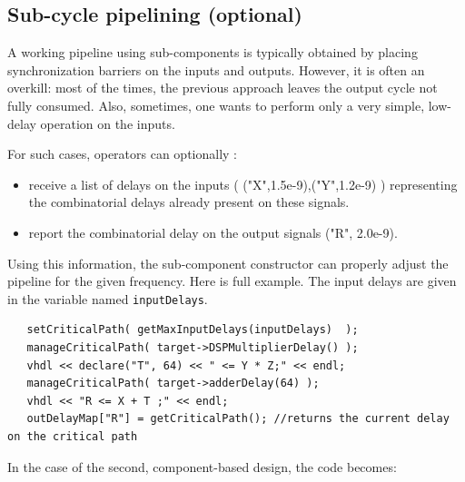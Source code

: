 \documentclass{article}
\begin{document}
\subsection{Sub-cycle pipelining (optional)}

A working pipeline using sub-components is typically obtained by
placing synchronization barriers on the inputs and outputs. However,
it is often an overkill: most of the times, the previous approach
leaves the output cycle not fully consumed. Also, sometimes, one wants
to perform only a very simple, low-delay operation on the inputs.


For such cases, operators can optionally :
\begin{itemize}
	\item receive a list of delays on the inputs ( ("X",1.5e-9),("Y",1.2e-9) ) representing
	the combinatorial delays already present on these signals.
	\item report the combinatorial delay on the output signals ("R", 2.0e-9).
\end{itemize}

Using this information, the sub-component constructor can properly
adjust the pipeline for the given frequency.  Here is full example. The input
delays are given in the variable named \verb!inputDelays!. 

\begin{verbatim}
   setCriticalPath( getMaxInputDelays(inputDelays)  );
   manageCriticalPath( target->DSPMultiplierDelay() );
   vhdl << declare("T", 64) << " <= Y * Z;" << endl;
   manageCriticalPath( target->adderDelay(64) );
   vhdl << "R <= X + T ;" << endl;
   outDelayMap["R"] = getCriticalPath(); //returns the current delay on the critical path
\end{verbatim}

In the case of the second, component-based design, the code becomes:
\end{document}
